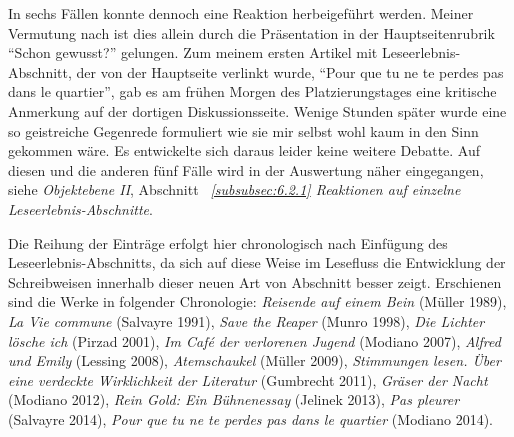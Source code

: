 \documentclass[fontsize=12pt]{scrartcl}
\begin{document}
In sechs F\"allen konnte dennoch eine Reaktion herbeigef\"uhrt werden. Meiner Vermutung nach ist dies allein durch die Pr\"asentation in der Hauptsei\-tenrubrik "`Schon gewusst?"' gelungen. Zum meinem ersten Artikel mit Leseerlebnis-Abschnitt, der von der Hauptseite verlinkt wurde, "`Pour que tu ne te perdes pas dans le quar\-tier"', gab es am fr\"uhen Morgen des Platzierungstages eine kritische Anmerkung auf der dortigen Dis\-kus\-si\-onsseite. Wenige Stunden sp\"ater wurde eine so geistreiche Gegenrede formuliert wie sie mir \mbox{selbst} wohl kaum in den Sinn gekommen w\"are. Es ent\-wickelte sich daraus leider keine weitere Debatte. Auf diesen und die anderen f\"unf F\"alle wird in der Auswertung n\"aher eingegangen, siehe \textit{Objektebene II}, Abschnitt \textit{~\ref{subsubsec:6.2.1} Reaktionen auf einzelne Leseerlebnis-Abschnitte}.

Die Reihung der Eintr\"age erfolgt \mbox{hier} chronologisch nach Einf\"ugung des Leseerlebnis-Abschnitts, da sich auf diese Weise im Lesefluss die Entwicklung der Schreibweisen innerhalb dieser neuen Art von Abschnitt besser zeigt. Erschienen sind die Werke in folgender Chronologie: \textit{Reisende auf einem Bein} (M\"uller 1989), \textit{La Vie commune} (Salvayre 1991), \textit{Save the Reaper} (Munro 1998), \textit{Die Lichter l\"osche ich} (Pirzad 2001), \textit{Im Caf\'{e} der verlorenen Jugend} (Modiano 2007), \textit{Alfred und Emily} (Lessing 2008), \textit{Atemschaukel} (M\"uller 2009), \textit{Stimmungen lesen. \"Uber eine verdeckte Wirklichkeit der Li\-te\-ra\-tur} (Gumbrecht 2011), \textit{Gr\"aser der Nacht} (Modiano 2012), \textit{Rein Gold: Ein B\"uhnenessay} (Jelinek 2013), \textit{Pas pleurer} (Salvayre 2014), \textit{Pour que tu ne te perdes pas dans le quartier} (Modiano 2014). 
\end{document}
